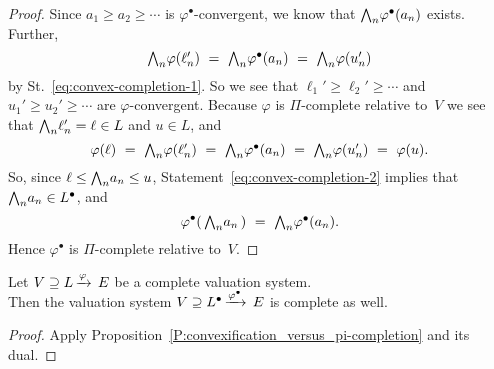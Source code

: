 \documentclass[main.tex]{subfiles}
\begin{document}
\begin{proof}
Since $a_1 \geq a_2 \geq \dotsb$
is $\varphi^\bullet$-convergent,
we know that $\textstyle{\bigwedge}_n \varphi^\bullet (a_n)$ exists.
Further,
\begin{equation*}
\bw_n \varphi(\ell_n') \ =\ 
\bw_n \varphi^\bullet(a_n) \ =\ 
\bw_n \varphi(u_n')
\end{equation*}
by St.~\eqref{eq:convex-completion-1}.
So we see that
$\ell_1' \geq \ell_2' \geq \dotsb$
and $u_1'\geq u_2'\geq \dotsb$
are $\varphi$-convergent.
Because $\varphi$ is $\Pi$-complete
relative to~$V$
we see that $\textstyle{\bigwedge}_n \ell_n'=\ell\in L$
and $u\in L$,
and 
\begin{equation}
\label{eq:convex-completion-2}
\varphi(\ell) \ = \ 
\bw_n \varphi(\ell_n')\ =\ 
\bw_n \varphi^\bullet(a_n)\ = \ 
\bw_n \varphi(u_n')\ = \ 
\varphi(u).
\end{equation}
So,
since $\ell\leq \textstyle{\bigwedge}_n a_n \leq u$,
Statement~\eqref{eq:convex-completion-2} implies that
$\textstyle{\bigwedge}_n a_n \in L^\bullet$,
and 
\begin{equation*}
\varphi^\bullet(\,\bw_n a_n\,)
\ = \ 
\bw_n \varphi^\bullet(a_n).
\end{equation*}
Hence $\varphi^\bullet$ is $\Pi$-complete relative to~$V$.
\end{proof}
%
%
%
\begin{prop}
\label{P:convexification_versus_completion}
Let $V \supseteq L\,\smash{\xrightarrow{\varphi}\,E}$ be a complete valuation system.\\
Then 
the valuation system 
$V \supseteq L^\bullet\,\smash{\xrightarrow{\varphi^\bullet}\,E}$ is complete as well.
\end{prop}
\begin{proof}
Apply Proposition~\ref{P:convexification_versus_pi-completion}
and its dual.
\end{proof}
\end{document}
